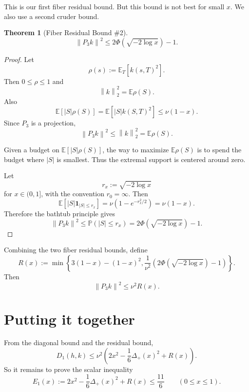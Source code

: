 \documentclass[11pt]{article}
\newtheorem{theorem}{Theorem}[section]
\newcommand{\E}{\mathbb E}
\newcommand{\norm}[1]{\left\|#1\right\|}
\newcommand{\one}{\mathbf 1}
\newcommand{\PhiG}{\Phi}
\begin{document}
This is our first fiber residual bound. But this bound is not best for small $x$.  We also use a second cruder bound. 

\begin{theorem}[Fiber Residual Bound \#2]
    \begin{equation}
        \norm{P_3k}^2
        \le
        2\PhiG(\sqrt{-2\log x})-1.
        \tag{6}
\end{equation}
\end{theorem}

\begin{proof}

Let
\[
        \rho(s):=\E_T[k(s,T)^2].
\]
Then $0\le\rho\le1$ and
\[
        \norm{k}^2_2=\E\rho(S).
\]
Also
\[
        \E[|S|\rho(S)]=\E[|S|k(S,T)^2]\le \nu(1-x).
\]
Since $P_3$ is a projection,
\[
        \norm{P_3k}^2\le \norm{k}^2_2=\E\rho(S).
\]

Given a budget on $\E[|S|\rho(S)]$, the way to maximize $\E\rho(S)$ is to spend the budget where $|S|$ is smallest.  Thus the extremal support is centered around zero.

Let
\[
        r_x:=\sqrt{-2\log x}
\]
for $x\in(0,1]$, with the convention $r_0=\infty$.  Then
\[
        \E[|S|\one_{|S|\le r_x}]=\nu(1-e^{-r_x^2/2})=\nu(1-x).
\]
Therefore the bathtub principle gives
\begin{equation}
        \norm{P_3k}^2
        \le
        \mathbb P(|S|\le r_x)
        =2\PhiG(\sqrt{-2\log x})-1.
        \tag{6}
\end{equation}
\end{proof}

Combining the two fiber residual bounds, define
\begin{equation}
        R(x):=
        \min\left\{
        3(1-x)-(1-x)^2,
        \frac{1}{\nu^2}\left(2\PhiG(\sqrt{-2\log x})-1\right)
        \right\}.
        \tag{7}
\end{equation}
Then
\[
        \norm{P_3k}^2\le \nu^2R(x).
\]

\section{Putting it together}

From the diagonal bound and the residual bound,
\[
        D_1(h,k)
        \le
        \nu^2\left(2x^2-\frac16\Delta_+(x)^2+R(x)\right).
\]
So it remains to prove the scalar inequality
\begin{equation}
        E_1(x):=2x^2-\frac16\Delta_+(x)^2+R(x)
        \le \frac{11}{6}
        \qquad(0\le x\le1).
        \tag{8}
\end{equation}
\end{document}
